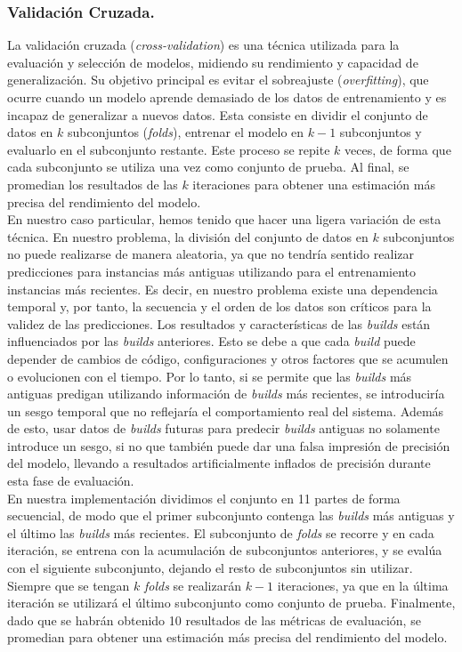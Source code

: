 \subsubsection{Validación Cruzada.}
La validación cruzada (\textit{cross-validation}) es una técnica utilizada para la evaluación y
selección de modelos, midiendo su rendimiento y capacidad de generalización. Su objetivo
principal es evitar el sobreajuste (\textit{overfitting}), que ocurre cuando un modelo
aprende demasiado de los datos de entrenamiento y es incapaz de generalizar a nuevos datos. Esta
consiste en dividir el conjunto de datos en $k$ subconjuntos (\textit{folds}), entrenar el modelo
en $k-1$ subconjuntos y evaluarlo en el subconjunto restante. Este proceso se repite $k$ veces,
de forma que cada subconjunto se utiliza una vez como conjunto de prueba. Al final, se promedian
los resultados de las $k$ iteraciones para obtener una estimación más precisa del rendimiento del
modelo.\\

En nuestro caso particular, hemos tenido que hacer una ligera variación de esta técnica. En
nuestro problema, la división del conjunto de datos en $k$ subconjuntos no puede realizarse de
manera aleatoria, ya que no tendría sentido realizar predicciones para instancias más antiguas
utilizando para el entrenamiento instancias más recientes. Es decir, en nuestro problema existe
una dependencia temporal y, por tanto, la secuencia y el orden de los datos son críticos para la
validez de las predicciones. Los resultados y características de las \textit{builds} están
influenciados por las \textit{builds} anteriores. Esto se debe a que cada \textit{build} puede
depender de cambios de código, configuraciones y otros factores que se acumulen o evolucionen
con el tiempo. Por lo tanto, si se permite que las \textit{builds} más antiguas predigan utilizando
información de \textit{builds} más recientes, se introduciría un sesgo temporal que no reflejaría
el comportamiento real del sistema. Además de esto, usar datos de \textit{builds} futuras para
predecir \textit{builds} antiguas no solamente introduce un sesgo, si no que también puede dar
una falsa impresión de precisión del modelo, llevando a resultados artificialmente inflados de
precisión durante esta fase de evaluación.\\

En nuestra implementación dividimos el conjunto en 11 partes de forma secuencial, de modo que el
primer subconjunto contenga las \textit{builds} más antiguas y el último las \textit{builds} más
recientes. El subconjunto de \textit{folds} se recorre y en cada iteración, se entrena con la
acumulación de subconjuntos anteriores, y se evalúa con el siguiente subconjunto, dejando el resto
de subconjuntos sin utilizar. Siempre que se tengan $k$ \textit{folds} se realizarán $k-1$
iteraciones, ya que en la última iteración se utilizará el último subconjunto como conjunto de
prueba. Finalmente, dado que se habrán obtenido 10 resultados de las métricas de evaluación, se
promedian para obtener una estimación más precisa del rendimiento del modelo.\\


